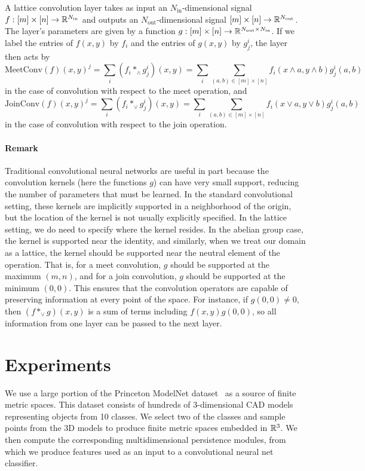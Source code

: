 \documentclass{article}
\begin{document}
A lattice convolution layer takes as input an $N_{\text{in}}$-dimensional signal
$f : [m] \times [n] \to \mathbb{R}^{N_{\text{in}}}$ and outputs an
$N_{\text{out}}$-dimensional signal $ [m] \times [n] \to
\mathbb{R}^{N_{\text{out}}}$. The layer's parameters are given by a function $g: [m]
\times [n] \to \mathbb{R}^{N_{\text{out}}\times N_{\text{in}}}$. If we label the
entries of $f(x,y)$ by $f_i$ and the entries of $g(x,y)$ by $g^i_j$, the layer then acts by
\[\text{MeetConv}(f)(x,y)^j = \sum_{i} (f_i \ast_{\wedge} g^i_j)(x,y) = \sum_i
  \sum_{(a,b) \in [m]\times [n]} f_i(x \wedge a, y \wedge b)g^i_j(a,b)\]
in the case of convolution with respect to the meet operation, and
\[\text{JoinConv}(f)(x,y)^j = \sum_{i} (f_i \ast_{\vee} g^i_j)(x,y) = \sum_i
  \sum_{(a,b) \in [m]\times [n]} f_i(x \vee a, y \vee b)g^i_j(a,b)\]
in the case of convolution with respect to the join operation.

\paragraph{Remark}
Traditional convolutional neural networks are useful in part because the
convolution kernels (here the functions $g$) can have very small support,
reducing the number of parameters that must be learned. In the standard
convolutional setting, these kernels are implicitly supported in a neighborhood
of the origin, but the location of the kernel is not usually explicitly
specified. In the lattice setting, we do need to specify where the kernel
resides. In the abelian group case, the kernel is supported near the identity,
and similarly, when we treat our domain as a lattice, the kernel should be
supported near the neutral element of the operation. That is, for a meet
convolution, $g$ should be supported at the maximum $(m,n)$, and for a join
convolution, $g$ should be supported at the minimum $(0,0)$. This ensures that
the convolution operators are capable of preserving information at every point
of the space. For instance, if $g(0,0) \neq 0$, then $(f \ast_{\vee} g)(x,y)$ is
a sum of terms including $f(x,y)g(0,0)$, so all information from one layer can
be passed to the next layer. 
\section{Experiments}
We use a large portion of the Princeton ModelNet
dataset~\cite{zhirong_wu_3d_2015} as a source of finite
metric spaces. This dataset consists of hundreds of 3-dimensional CAD models
representing objects from 10 classes. We select two of the classes and sample
points from the 3D models to produce finite metric spaces embedded in $\mathbb{R}^3$.
We then compute the corresponding multidimensional persistence modules, from
which we produce features used as an input to a convolutional neural net
classifier.
\end{document}
